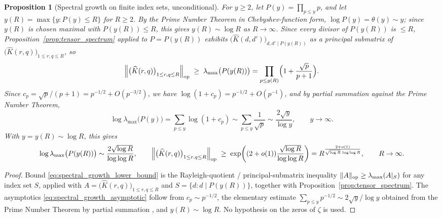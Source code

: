 \documentclass[11pt]{amsart}
\numberwithin{equation}{section}
\theoremstyle{plain}
\newtheorem{proposition}[theorem]{Proposition}
\theoremstyle{definition}
\theoremstyle{remark}
\newcommand{\zetaR}{\zeta}
\begin{document}
\begin{proposition}[Spectral growth on finite index sets, unconditional]
\label{prop:spectral_growth}
For \(y\ge2\), let \(P(y)=\prod_{p\le y}p\), and let \(y(R)=\max\{y:P(y)\le R\}\) for \(R\ge2\).  By the Prime Number Theorem \cite{Apostol1976} in Chebyshev-function form, \(\log P(y)=\theta(y)\sim y\); since \(y(R)\) is chosen maximal with \(P(y(R))\le R\), this gives \(y(R)\sim\log R\) as \(R\to\infty\).  Since every divisor of \(P(y(R))\) is \(\le R\), Proposition~\ref{prop:tensor_spectrum} applied to \(P=P(y(R))\) exhibits \(\bigl(\widehat K(d,d')\bigr)_{d,d'\mid P(y(R))}\) as a principal submatrix of \(\bigl(\widehat K(r,q)\bigr)_{1\le r,q\le R}\), so
\begin{equation}
\Bigl\|\bigl(\widehat K(r,q)\bigr)_{1\le r,q\le R}\Bigr\|_{\rm op}
\;\ge\;
\lambda_{\max}\bigl(P(y(R))\bigr)
=\prod_{p\le y(R)}\Bigl(1+\frac{\sqrt p}{p+1}\Bigr).
\label{eq:spectral_growth_lower_bound}
\end{equation}
Since \(c_p=\sqrt p/(p+1)=p^{-1/2}+O(p^{-3/2})\), we have \(\log(1+c_p)=p^{-1/2}+O(p^{-1})\), and by partial summation against the Prime Number Theorem,
\begin{equation}
\log\lambda_{\max}\bigl(P(y)\bigr)
=\sum_{p\le y}\log(1+c_p)
\sim\sum_{p\le y}\frac1{\sqrt p}
\sim\frac{2\sqrt y}{\log y},
\qquad y\to\infty.
\label{eq:spectral_growth_asymptotic}
\end{equation}
With \(y=y(R)\sim\log R\), this gives
\begin{equation}
\log\lambda_{\max}\bigl(P(y(R))\bigr)\sim\frac{2\sqrt{\log R}}{\log\log R},
\qquad
\Bigl\|\bigl(\widehat K(r,q)\bigr)_{1\le r,q\le R}\Bigr\|_{\rm op}
\;\ge\;
\exp\!\left((2+o(1))\frac{\sqrt{\log R}}{\log\log R}\right)
=R^{\frac{2+o(1)}{\sqrt{\log R}\,\log\log R}},
\qquad R\to\infty.
\label{eq:spectral_growth_final}
\end{equation}
\end{proposition}

\begin{proof}
Bound \eqref{eq:spectral_growth_lower_bound} is the Rayleigh-quotient / principal-submatrix inequality \(\|A\|_{\rm op}\ge\lambda_{\max}(A|_S)\) for any index set \(S\), applied with \(A=\bigl(\widehat K(r,q)\bigr)_{1\le r,q\le R}\) and \(S=\{d:d\mid P(y(R))\}\), together with Proposition~\ref{prop:tensor_spectrum}.  The asymptotics \eqref{eq:spectral_growth_asymptotic} follow from \(c_p\sim p^{-1/2}\), the elementary estimate \(\sum_{p\le y}p^{-1/2}\sim2\sqrt y/\log y\) obtained from the Prime Number Theorem by partial summation \cite{Apostol1976}, and \(y(R)\sim\log R\).  No hypothesis on the zeros of \(\zetaR\) is used.
\end{proof}
\end{document}
